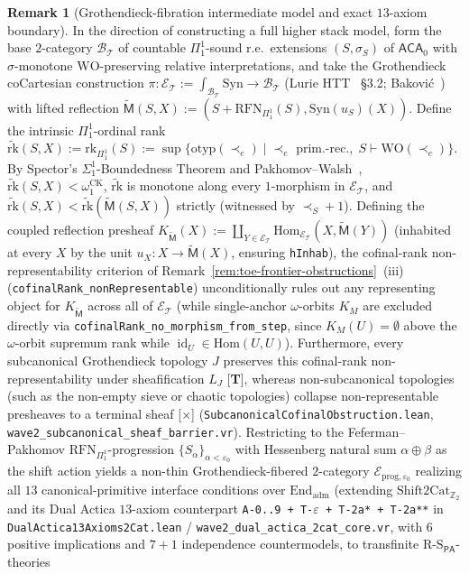 \documentclass[11pt]{article}
\theoremstyle{plain}
\theoremstyle{definition}
\newtheorem{remark}[theorem]{Remark}
\newcommand{\RS}{\mathrm{R\text{-}S}}
\newcommand{\Hom}{\mathrm{Hom}}
\newcommand{\Syn}{\mathrm{Syn}}
\newcommand{\PA}{\mathsf{PA}}
\DeclareMathOperator{\id}{id}
\begin{document}
\begin{remark}[Grothendieck-fibration intermediate model and exact $13$-axiom boundary]\label{rem:grothendieck-intermediate-model}
In the direction of constructing a full higher stack model, form the base $2$-category $\mathcal{B}_{\mathcal{T}}$ of countable $\Pi_1^1$-sound r.e.\ extensions $(S, \sigma_S)$ of $\mathsf{ACA}_0$ with $\sigma$-monotone $\mathrm{WO}$-preserving relative interpretations, and take the Grothendieck coCartesian construction $\pi : \mathcal{E}_{\mathcal{T}} := \int_{\mathcal{B}_{\mathcal{T}}} \Syn \to \mathcal{B}_{\mathcal{T}}$ (Lurie HTT~\cite{LurieHTT} \S 3.2; Bakovi\'c~\cite{Bakovic2010}) with lifted reflection $\widetilde{\mathsf{M}}(S, X) := (S + \mathrm{RFN}_{\Pi_1^1}(S), \Syn(u_S)(X))$. Define the intrinsic $\Pi_1^1$-ordinal rank $\widetilde{\mathrm{rk}}(S, X) := \mathrm{rk}_{\Pi_1^1}(S) := \sup\{\mathrm{otyp}(\prec_e) \mid \prec_e \text{ prim.-rec.},\; S \vdash \mathrm{WO}(\prec_e)\}$. By Spector's $\Sigma_1^1$-Boundedness Theorem and Pakhomov--Walsh~\cite{PakhomovWalsh2021}, $\widetilde{\mathrm{rk}}(S, X) < \omega_1^{\mathrm{CK}}$, $\widetilde{\mathrm{rk}}$ is monotone along every $1$-morphism in $\mathcal{E}_{\mathcal{T}}$, and $\widetilde{\mathrm{rk}}(S, X) < \widetilde{\mathrm{rk}}(\widetilde{\mathsf{M}}(S, X))$ strictly (witnessed by $\prec_S + 1$). Defining the coupled reflection presheaf $K_{\widetilde{\mathsf{M}}}(X) := \coprod_{Y \in \mathcal{E}_{\mathcal{T}}} \Hom_{\mathcal{E}_{\mathcal{T}}}(X, \widetilde{\mathsf{M}}(Y))$ (inhabited at every $X$ by the unit $u_X : X \to \widetilde{\mathsf{M}}(X)$, ensuring \texttt{hInhab}), the cofinal-rank non-representability criterion of Remark~\ref{rem:toe-frontier-obstructions}~(iii) (\texttt{cofinalRank\_\allowbreak nonRepresentable}) unconditionally rules out any representing object for $K_{\widetilde{\mathsf{M}}}$ across all of $\mathcal{E}_{\mathcal{T}}$ (while single-anchor $\omega$-orbits $K_M$ are excluded directly via \texttt{cofinalRank\_\allowbreak no\_\allowbreak morphism\_\allowbreak from\_\allowbreak step}, since $K_M(U) = \emptyset$ above the $\omega$-orbit supremum rank while $\id_U \in \Hom(U, U)$). Furthermore, every subcanonical Grothendieck topology $J$ preserves this cofinal-rank non-representability under sheafification $L_J$ \textup{[\textbf{T}]}, whereas non-subcanonical topologies (such as the non-empty sieve or chaotic topologies) collapse non-representable presheaves to a terminal sheaf \textup{[\textbf{$\times$}]} (\texttt{SubcanonicalCofinalObstruction.lean}, \texttt{wave2\_subcanonical\_sheaf\_barrier.vr}). Restricting to the Feferman--Pakhomov $\mathrm{RFN}_{\Pi_1^1}$-progression $\{S_\alpha\}_{\alpha < \varepsilon_0}$ with Hessenberg natural sum $\alpha \oplus \beta$ as the shift action yields a non-thin Grothendieck-fibered $2$-category $\mathcal{E}_{\mathrm{prog}, \varepsilon_0}$ realizing all $13$ canonical-primitive interface conditions over $\mathrm{End}_{\mathrm{adm}}$ (extending $\mathrm{Shift2Cat}_{\mathbb{Z}_2}$ and its Dual Actica $13$-axiom counterpart \texttt{A-0..9 + T-$\varepsilon$ + T-2a* + T-2a**} in \texttt{DualActica13Axioms2Cat.lean} / \texttt{wave2\_dual\_actica\_2cat\_core.vr}, with $6$ positive implications and $7+1$ independence countermodels, to transfinite $\RS_{\PA}$-theories 
\end{remark}
\end{document}
